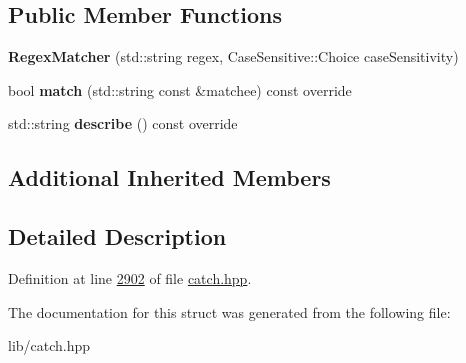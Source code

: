 \subsection*{Public Member Functions}
\begin{DoxyCompactItemize}
\item 
\mbox{\label{structCatch_1_1Matchers_1_1StdString_1_1RegexMatcher_ab914deb885fe25558c41ab368c6b3916}} 
{\bfseries Regex\+Matcher} (std\+::string regex, Case\+Sensitive\+::\+Choice case\+Sensitivity)
\item 
\mbox{\label{structCatch_1_1Matchers_1_1StdString_1_1RegexMatcher_aa8e61adccabb2f36133029301f6b8f4e}} 
bool {\bfseries match} (std\+::string const \&matchee) const override
\item 
\mbox{\label{structCatch_1_1Matchers_1_1StdString_1_1RegexMatcher_a1f788cd5258c987e5043f6c7f43adeb9}} 
std\+::string {\bfseries describe} () const override
\end{DoxyCompactItemize}
\subsection*{Additional Inherited Members}


\subsection{Detailed Description}


Definition at line \mbox{\hyperlink{catch_8hpp_source_l02902}{2902}} of file \mbox{\hyperlink{catch_8hpp_source}{catch.\+hpp}}.



The documentation for this struct was generated from the following file\+:\begin{DoxyCompactItemize}
\item 
lib/catch.\+hpp\end{DoxyCompactItemize}
